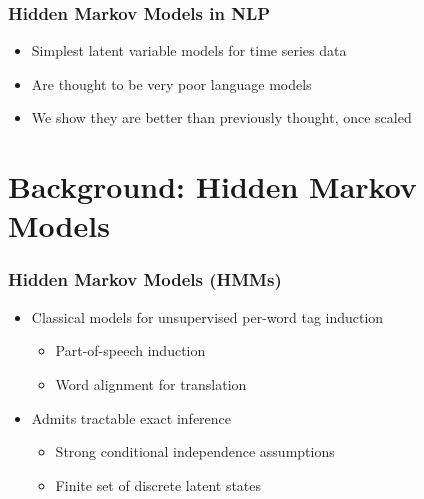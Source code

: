 \documentclass{beamer}
\begin{document}
\begin{frame}
\frametitle{Hidden Markov Models in NLP}
\begin{itemize}
\item Simplest latent variable models for time series data
\vspace{2em}
\item Are thought to be very poor language models
\vspace{2em}
\item We show they are better than previously thought, once scaled
\end{itemize}
\end{frame}

\section{Background: Hidden Markov Models}
\begin{frame}
\frametitle{Hidden Markov Models (HMMs)}
\begin{itemize}
\item Classical models for unsupervised per-word tag induction
\vspace{1em}
    \begin{itemize}
    \item Part-of-speech induction
    \vspace{1em}
    \item Word alignment for translation
    \end{itemize}
\vspace{1em}
\item Admits tractable exact inference
\vspace{1em}
    \begin{itemize}
    \item Strong conditional independence assumptions
    \vspace{1em}
    \item Finite set of discrete latent states
    \end{itemize}
\end{itemize}
\end{frame}
\end{document}
